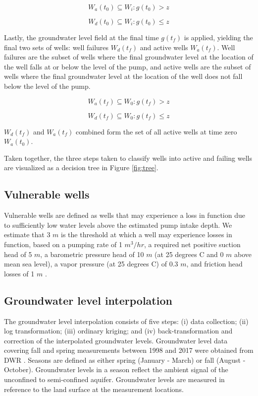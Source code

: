$$W_a(t_0) \subseteq W_i : g({t_0}) > z$$  

$$W_d(t_0) \subseteq W_i : g({t_0}) \leq z$$

Lastly, the groundwater level field at the final time $g({t_f})$ is applied, yielding the final two sets of wells: well failures $W_d(t_f)$ and active wells $W_a(t_f)$. Well failures are the subset of wells where the final groundwater level at the location of the well falls at or below the level of the pump, and active wells are the subset of wells where the final groundwater level at the location of the well does not fall below the level of the pump.  

$$W_a(t_f) \subseteq W_0 : g({t_f}) > z$$  

$$W_d(t_f) \subseteq W_0 : g({t_f}) \leq z$$  

$W_d(t_f)$ and $W_a(t_f)$ combined form the set of all active wells at time zero $W_a(t_0)$. 

Taken together, the three steps taken to classify wells into active and failing wells are visualized as a decision tree in Figure \ref{fig:tree}.  


\subsection{Vulnerable wells}
\label{ap_a_vi}

Vulnerable wells are defined as wells that may experience a loss in function due to sufficiently low water levels above the estimated pump intake depth. We estimate that 3 $m$ is the threshold at which a well may experience losses in function, based on a pumping rate of 1 $m^3 / hr$, a required net positive suction head of 5 $m$, a barometric pressure head of 10 $m$ (at 25 degrees C and 0 $m$ above mean sea level), a vapor pressure (at 25 degrees C) of 0.3 $m$, and friction head losses of 1 $m$ \cite{Tullis1989}. 


\subsection{Groundwater level interpolation}
\label{ap_a_gwl}

The groundwater level interpolation consists of five steps: (i) data collection; (ii) log transformation; (iii) ordinary kriging; and (iv) back-transformation and correction of the interpolated groundwater levels.  
Groundwater level data covering fall and spring measurements between 1998 and 2017 were obtained from DWR \cite{gwl}. Seasons are defined as either spring (January - March) or fall (August - October). Groundwater levels in a season reflect the ambient signal of the unconfined to semi-confined aquifer. Groundwater levels are measured in reference to the land surface at the measurement locations.

